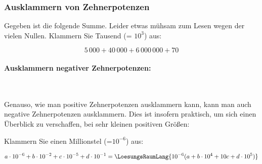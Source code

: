\subsubsection{Ausklammern von Zehnerpotenzen}
Gegeben ist die folgende Summe. Leider etwas mühsam zum Lesen wegen der vielen Nullen. Klammern Sie Tausend (= $10^3$) aus:

$$5\,000 + 40\,000 + 6\,000\,000 + 70$$


\paragraph{Ausklammern negativer Zehnerpotenzen:}
\,

\vspace{1mm}

Genauso, wie man positive Zehnerpotenzen ausklammern kann, kann man auch negative Zehnerpotenzen ausklammern. Dies ist insofern praktisch, um sich einen Überblick zu verschaffen, bei sehr kleinen positiven Größen:

Klammern Sie einen Millionstel (=$10^{-6}$) aus:


$$a\cdot{}10^{-6} + b\cdot{}10^{-2} + c\cdot{}10^{-5} + d\cdot{}10^{-1} = \LoesungsRaumLang{10^{-6} (a + b\cdot{}10^4 + 10c + d\cdot{}10^{5})}$$

\newpage
